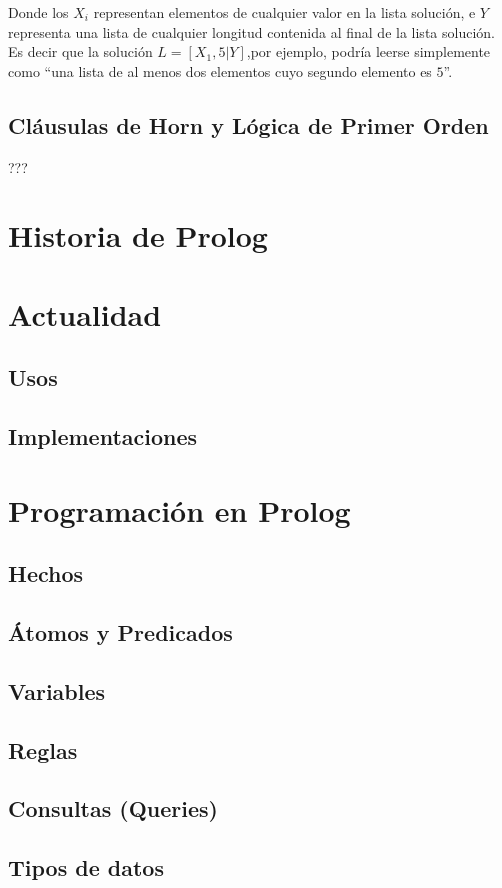 \documentclass[12pt,titlepage]{article}
\begin{document}
Donde los $X_i$ representan elementos de cualquier valor en la lista solución, e $Y$ representa una lista de cualquier longitud contenida al final de la lista solución. Es decir que la solución $L=[X_1,5|Y]$,por ejemplo, podría leerse simplemente como ``una lista de al menos dos elementos cuyo segundo elemento es $5$''.

\subsection{Cláusulas de Horn y Lógica de Primer Orden}
???

\section{Historia de Prolog}

\section{Actualidad}
\subsection{Usos}
\subsection{Implementaciones}

\section{Programación en Prolog}
\subsection{Hechos}
\subsection{Átomos y Predicados}
\subsection{Variables}
\subsection{Reglas}
\subsection{Consultas (Queries)}
\subsection{Tipos de datos}
\end{document}
